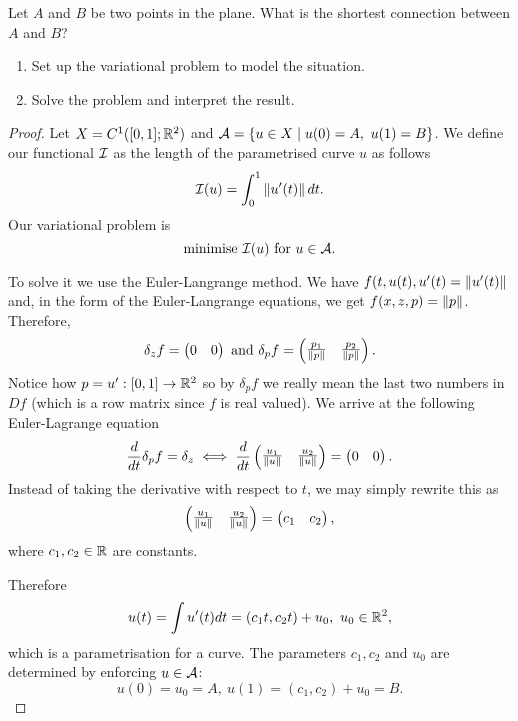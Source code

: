 \begin{ex}
  [Geodesics in $\R^2$]

  Let $A$ and $B$ be two points in the plane. What is the shortest connection between $A$ and $B$?

  \begin{enumerate}
    \item Set up the variational problem to model the situation.
    \item Solve the problem and interpret the result.
  \end{enumerate}
\end{ex}

\begin{proof}
  Let $X = C^1([0,1]; \mathbb{R}^2)$ and $\mathcal{A} = \{ u \in X \mid u(0) = A,\ u(1) =
  B\}$. We define our functional $\mathcal{I}$ as the length of the parametrised
  curve $u$ as follows
  \[
    \mathcal{I}(u) = \int_0^1 \left\Vert{u'(t)}\right\Vert dt.
  \]
  Our variational problem is
  \[
    \text{minimise } \mathcal{I}(u) \text{ for } u \in \mathcal{A}.
  \]

  To solve it we use the Euler-Langrange method. We have $f(t, u(t), u'(t) =
  \left\Vert{u'(t)}\right\Vert$ and, in the form of the Euler-Langrange equations, we get $f(x,
  z, p) = \left\Vert{p}\right\Vert$. Therefore,
  \[
    \delta_z f = 
    \begin{pmatrix}
      0 & 0
    \end{pmatrix}
    \text{ and } \delta_p f =
    \begin{pmatrix}
      \frac{p_1}{\left\Vert{p}\right\Vert} & \frac{p_2}{\left\Vert{p}\right\Vert}
    \end{pmatrix}.
  \]
  Notice how $p = u' : [0, 1] \to \mathbb{R}^2$ so by $\delta_p f$ we really mean the
  last two numbers in $Df$ (which is a row matrix since $f$ is real valued). We
  arrive at the following Euler-Lagrange equation
  \[
    \frac{d}{dt} \delta_p f = \delta_z \iff \frac{d}{dt}
    \begin{pmatrix}
      \frac{u_1}{\left\Vert{u}\right\Vert} & \frac{u_2}{\left\Vert{u}\right\Vert} 
    \end{pmatrix}
    =
    \begin{pmatrix}
      0 & 0
    \end{pmatrix}.
  \]
  Instead of taking the derivative with respect to $t$, we may simply rewrite
  this as
  \[
  \begin{pmatrix}
    \frac{u_1}{\left\Vert{u}\right\Vert} & \frac{u_2}{\left\Vert{u}\right\Vert}
  \end{pmatrix}
  =
  \begin{pmatrix}
    c_1 & c_2
  \end{pmatrix},
  \]
  where $c_1, c_2 \in \mathbb{R}$ are constants.

  Therefore
  \[
    u(t) = \int u'(t) dt = (c_1 t, c_2 t) + u_0,\ u_0 \in \mathbb{R}^2,
  \]
  which is a parametrisation for a curve. The parameters $c_1, c_2$ and $u_0$
  are determined by enforcing $u \in \mathcal{A}$:
  \[
    u(0) = u_0 = A,\ u(1) = (c_1, c_2)  + u_0 = B.
  \]
\end{proof}

